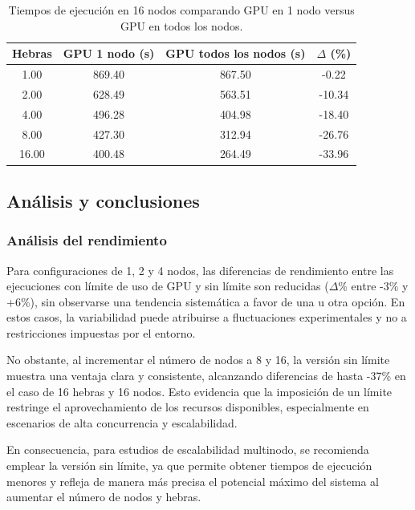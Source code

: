 \begin{table}[ht]
    \centering
    \begin{tabular}{c|ccc}
        Hebras & GPU 1 nodo (s) & GPU todos los nodos (s) & $\Delta$ (\%) \\
        \hline
        1.00   & 869.40         & 867.50                  & -0.22         \\
        2.00   & 628.49         & 563.51                  & -10.34        \\
        4.00   & 496.28         & 404.98                  & -18.40        \\
        8.00   & 427.30         & 312.94                  & -26.76        \\
        16.00  & 400.48         & 264.49                  & -33.96        \\
    \end{tabular}
    \caption{Tiempos de ejecución en 16 nodos comparando GPU en 1 nodo versus GPU en todos los nodos.}
    \label{tab:gpu_16nodes}
\end{table}

\subsection{Análisis y conclusiones}

\subsubsection{Análisis del rendimiento}

Para configuraciones de 1, 2 y 4 nodos, las diferencias de rendimiento entre las ejecuciones con límite de uso de GPU y sin límite son reducidas (\(\Delta\)\% entre -3\% y +6\%), sin observarse una tendencia sistemática a favor de una u otra opción. En estos casos, la variabilidad puede atribuirse a fluctuaciones experimentales y no a restricciones impuestas por el entorno.

No obstante, al incrementar el número de nodos a 8 y 16, la versión sin límite muestra una ventaja clara y consistente, alcanzando diferencias de hasta -37\% en el caso de 16 hebras y 16 nodos. Esto evidencia que la imposición de un límite restringe el aprovechamiento de los recursos disponibles, especialmente en escenarios de alta concurrencia y escalabilidad.

En consecuencia, para estudios de escalabilidad multinodo, se recomienda emplear la versión sin límite, ya que permite obtener tiempos de ejecución menores y refleja de manera más precisa el potencial máximo del sistema al aumentar el número de nodos y hebras.

